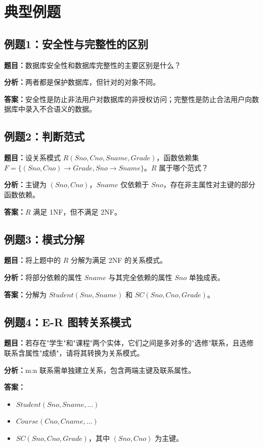 \documentclass{../../note}
\begin{document}
\section{典型例题}

\subsection{例题1：安全性与完整性的区别}

\textbf{题目：}数据库安全性和数据库完整性的主要区别是什么？

\textbf{分析：}两者都是保护数据库，但针对的对象不同。

\textbf{答案：}安全性是防止非法用户对数据库的非授权访问；完整性是防止合法用户向数据库中录入不合语义的数据。

\subsection{例题2：判断范式}

\textbf{题目：}设关系模式 $R(Sno, Cno, Sname, Grade)$，函数依赖集 $F = \{(Sno, Cno) \to Grade, Sno \to Sname\}$。$R$ 属于哪个范式？

\textbf{分析：}主键为 $(Sno, Cno)$，$Sname$ 仅依赖于 $Sno$，存在非主属性对主键的部分函数依赖。

\textbf{答案：}$R$ 满足 1NF，但不满足 2NF。

\subsection{例题3：模式分解}

\textbf{题目：}将上题中的 $R$ 分解为满足 2NF 的关系模式。

\textbf{分析：}将部分依赖的属性 $Sname$ 与其完全依赖的属性 $Sno$ 单独成表。

\textbf{答案：}分解为 $Student(Sno, Sname)$ 和 $SC(Sno, Cno, Grade)$。

\subsection{例题4：E-R 图转关系模式}

\textbf{题目：}若存在"学生"和"课程"两个实体，它们之间是多对多的"选修"联系，且选修联系含属性"成绩"，请将其转换为关系模式。

\textbf{分析：}m:n 联系需单独建立关系，包含两端主键及联系属性。

\textbf{答案：}
\begin{itemize}
  \item $Student(Sno, Sname, \ldots)$
  \item $Course(Cno, Cname, \ldots)$
  \item $SC(Sno, Cno, Grade)$，其中 $(Sno, Cno)$ 为主键。
\end{itemize}
\end{document}

